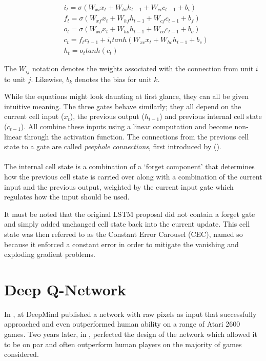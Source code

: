 \begin{align}
  &i_t = \sigma(W_{xi}x_t + W_{hi}h_{t-1}+W_{ci}c_{t-1} + b_i) \\
  &f_t = \sigma(W_{xf}x_t + W_{hf}h_{t-1}+W_{cf}c_{t-1} + b_f) \\
  &o_t = \sigma(W_{xo}x_t + W_{ho}h_{t-1}+W_{co}c_{t-1} + b_o) \\
  &c_t = f_tc_{t-1}+i_t tanh(W_{xc}x_t+W_{hc}h_{t-1}+b_c) \\
  &h_t = o_t tanh(c_t)
\end{align}

The $W_{ij}$ notation denotes the weights associated
with the connection from unit $i$ to unit $j$.
Likewise, $b_k$ denotes the bias for unit $k$.

While the equations might look daunting at first glance,
they can all be given intuitive meaning.
The three gates behave similarly;
they all depend on the current cell input ($x_t$),
the previous output ($h_{t-1}$)
and previous internal cell state ($c_{t-1}$).
All combine these inputs using a linear computation
and become non-linear through the activation function.
The connections from the previous cell state
to a gate are called \textit{peephole connections},
first introduced by
\citeauthor{gers2000recurrent} (\citeyear{gers2000recurrent}).

\paragraph{}
The internal cell state is a combination
of a `forget component' that determines
how the previous cell state is carried over
along with a combination of the current input and the previous output,
weighted by the current input gate
which regulates how the input should be used.

It must be noted that the original LSTM proposal
did not contain a forget gate
and simply added unchanged cell state
back into the current update.
This cell state was then referred to as the Constant Error Carousel (CEC),
named so because it enforced a constant error
in order to mitigate the vanishing and exploding gradient problems.


\section{Deep Q-Network}
\label{sec:dqn}
In \citeyear{Mnih2013},
\citeauthor{Mnih2013} at DeepMind
published a network
with raw pixels as input
that successfully
approached and even outperformed human ability
on a range of Atari 2600 games.
Two years later,
in \citeyear{Mnih2015},
\citeauthor{Mnih2015}
perfected the design of the network
which allowed it to be on par
and often outperform human players
on the majority of games considered.

